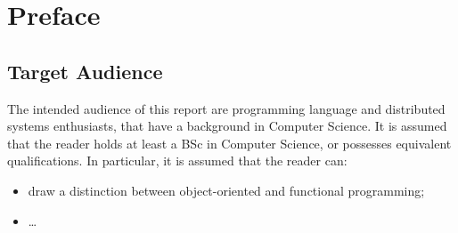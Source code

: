 \chapter*{Preface}



\section{Target Audience}

The intended audience of this report are programming language and
distributed systems enthusiasts, that have a background in Computer
Science. It is assumed that the reader holds at least a BSc in
Computer Science, or possesses equivalent qualifications. In
particular, it is assumed that the reader can:

\begin{itemize}

\item draw a distinction between object-oriented and functional
programming;

\item \ldots

\end{itemize}
